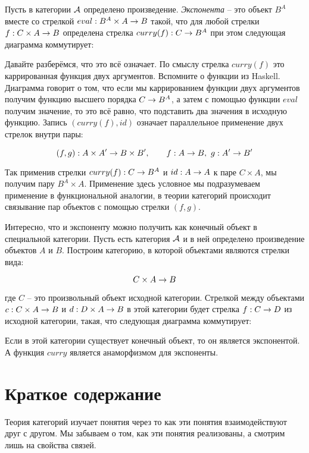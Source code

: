 Пусть в категории $\mathcal{A}$ определено произведение.
\emph{Экспонента} -- это объект $B^A$ вместе со стрелкой
$eval : B^A \times A \rightarrow B$ такой, что для любой стрелки
$f : C \times A \rightarrow B$ определена стрелка $curry(f):C \rightarrow B^A$ 
при этом следующая диаграмма коммутирует:


Давайте разберёмся, что это всё означает. По смыслу 
стрелка $curry(f)$ это каррированная функция двух аргументов.
Вспомните о функции  из Haskell. Диаграмма говорит
о том, что если мы каррированием функции двух аргументов 
получим функцию высшего порядка $C \rightarrow B^A$, а затем с 
помощью функции $eval$ получим значение, то это всё равно, 
что подставить два значения в исходную функцию. Запись 
$(curry(f), id)$ означает параллельное применение двух 
стрелок внутри пары:

\[ (f, g) : A \times A' \rightarrow B \times B' 
            , \qquad f : A\rightarrow B , \ g : A' \rightarrow B' \] 

Так применив стрелки $curry(f) : C \rightarrow B^A$  и $id : A \rightarrow A$ к паре
$C \times A$, мы получим пару $B^A \times A$. Применение
здесь условное мы подразумеваем применение в функциональной аналогии,
в теории категорий происходит связывание пар объектов
с помощью стрелки $(f, g)$.

Интересно, что и экспоненту можно получить как конечный
объект в специальной категории. Пусть есть категория $\mathcal{A}$
и в ней определено произведение объектов $A$ и $B$. Построим
категорию, в которой объектами являются стрелки вида:

\[ C \times A \rightarrow B \]

\noindent где $C$ -- это произвольный объект исходной категории.
Стрелкой между объектами $c : C \times A \rightarrow B$ и $d : D \times A \rightarrow B$
в этой категории будет стрелка $f : C \rightarrow D$ из исходной категории,
такая, что следующая диаграмма коммутирует: 


Если в этой категории существует конечный объект,
то он является экспонентой. А функция $curry$
является анаморфизмом для экспоненты.

\section{Краткое содержание}

Теория категорий изучает понятия
через то как эти понятия взаимодействуют друг с другом.
Мы забываем о том, как эти понятия реализованы, а смотрим
лишь на свойства связей. 

